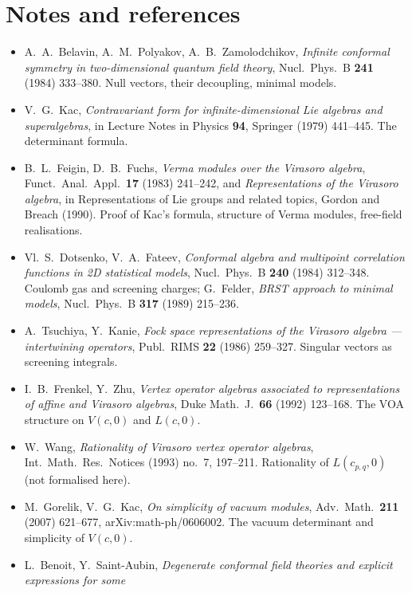 \section{Notes and references}\label{l06:sec:notes}

\begin{itemize}
\item A.~A.~Belavin, A.~M.~Polyakov, A.~B.~Zamolodchikov, \emph{Infinite conformal symmetry in two-dimensional
  quantum field theory}, Nucl.\ Phys.\ B \textbf{241} (1984) 333--380. Null vectors, their decoupling, minimal
  models.
\item V.~G.~Kac, \emph{Contravariant form for infinite-dimensional Lie algebras and superalgebras}, in Lecture
  Notes in Physics \textbf{94}, Springer (1979) 441--445. The determinant formula.
\item B.~L.~Feigin, D.~B.~Fuchs, \emph{Verma modules over the Virasoro algebra}, Funct.\ Anal.\ Appl.\
  \textbf{17} (1983) 241--242, and \emph{Representations of the Virasoro algebra}, in Representations of Lie
  groups and related topics, Gordon and Breach (1990). Proof of Kac's formula, structure of Verma modules,
  free-field realisations.
\item Vl.~S.~Dotsenko, V.~A.~Fateev, \emph{Conformal algebra and multipoint correlation functions in 2D
  statistical models}, Nucl.\ Phys.\ B \textbf{240} (1984) 312--348. Coulomb gas and screening charges;
  G.~Felder, \emph{BRST approach to minimal models}, Nucl.\ Phys.\ B \textbf{317} (1989) 215--236.
\item A.~Tsuchiya, Y.~Kanie, \emph{Fock space representations of the Virasoro algebra --- intertwining
  operators}, Publ.\ RIMS \textbf{22} (1986) 259--327. Singular vectors as screening integrals.
\item I.~B.~Frenkel, Y.~Zhu, \emph{Vertex operator algebras associated to representations of affine and Virasoro
  algebras}, Duke Math.\ J.\ \textbf{66} (1992) 123--168. The VOA structure on $V(c,0)$ and $L(c,0)$.
\item W.~Wang, \emph{Rationality of Virasoro vertex operator algebras}, Int.\ Math.\ Res.\ Notices (1993) no.~7,
  197--211. Rationality of $L(c_{p,q},0)$ (not formalised here).
\item M.~Gorelik, V.~G.~Kac, \emph{On simplicity of vacuum modules}, Adv.\ Math.\ \textbf{211} (2007) 621--677,
  arXiv:math-ph/0606002. The vacuum determinant and simplicity of $V(c,0)$.
\item L.~Benoit, Y.~Saint-Aubin, \emph{Degenerate conformal field theories and explicit expressions for some
}
\end{itemize}
